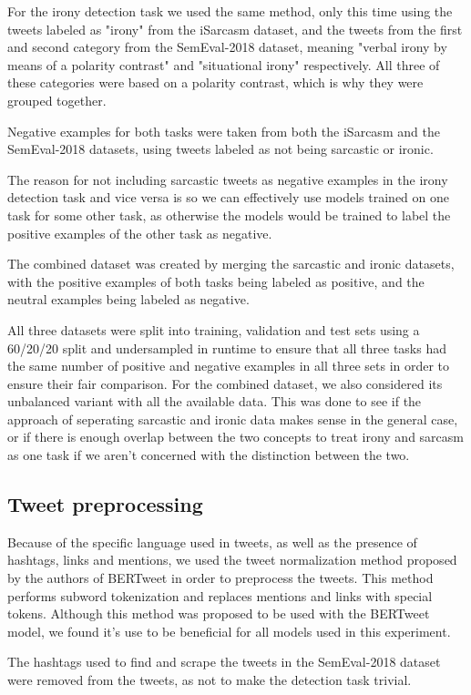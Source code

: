 \documentclass[10pt, a4paper]{article}
\begin{document}
For the irony detection task we used the same method, only this time using the tweets labeled as "irony" from the iSarcasm
dataset, and the tweets from the first and second category from the SemEval-2018 dataset, meaning "verbal irony by means 
of a polarity contrast" and "situational irony" respectively. All three of these categories were based
on a polarity contrast, which is why they were grouped together.

Negative examples for both tasks were taken from both the iSarcasm and the SemEval-2018 datasets, using tweets labeled as
not being sarcastic or ironic.

The reason for not including sarcastic tweets as negative examples in the irony detection task and vice versa is so we
can effectively use models trained on one task for some other task, as otherwise the models would be trained
to label the positive examples of the other task as negative.

The combined dataset was created by merging the sarcastic and ironic datasets, with the positive examples of both tasks
being labeled as positive, and the neutral examples being labeled as negative.

All three datasets were split into training, validation and test sets using a 60/20/20 split and undersampled in runtime to ensure that all three
tasks had the same number of positive and negative examples in all three sets in order to ensure their fair comparison. For
the combined dataset, we also considered its unbalanced variant with all the available data. This was done to see if the 
approach of seperating sarcastic and ironic data makes sense in the general case, or if there is enough overlap between 
the two concepts to treat irony and sarcasm as one task if we aren't concerned with the distinction between the two.

\subsection{Tweet preprocessing}
Because of the specific language used in tweets, as well as the presence of hashtags, links and mentions, we used the
tweet normalization method proposed by the authors of BERTweet \citep{bertweet} in order to preprocess the tweets. This method
performs subword tokenization and replaces mentions and links with special tokens. Although this method was proposed to be 
used with the BERTweet model, we found it's use to be beneficial for all models used in this experiment.

The hashtags used to find and scrape the tweets in the SemEval-2018 dataset were removed
from the tweets, as not to make the detection task trivial.
\end{document}
